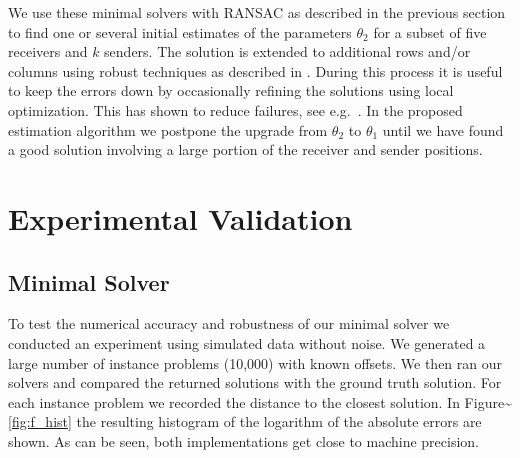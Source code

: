 \documentclass[
]{book}
\begin{document}
We use these minimal solvers with RANSAC as described in the previous section to find one or several initial estimates of the parameters \(\theta_2\) for a subset of five receivers and \(k\) senders. The solution is extended to additional rows and/or columns using robust techniques as described in \cite{batstone2016robust}. During this process it is useful to keep the errors down by occasionally refining the solutions using local optimization. This has shown to reduce failures, see e.g.~\cite{engels-stewenius-etal-06,klein2007parallel}.
In the proposed estimation algorithm we postpone the upgrade from \(\theta_2\) to \(\theta_1\) until we have found a good solution involving a large portion of the receiver and sender positions.
\vspace{-5pt}

\section{Experimental Validation}
\label{sec:exp}
\vspace{-5pt}
\subsection{Minimal Solver}
\vspace{-5pt}

To test the numerical accuracy and robustness of our minimal solver we conducted an experiment using simulated data without noise. We generated a large number of instance problems (10,000) with known offsets. We then ran our solvers and compared the returned solutions with the ground truth solution. For each instance problem we recorded the distance to the closest solution. In Figure\textasciitilde{}\ref{fig:f_hist} the resulting histogram of the logarithm of the absolute errors are shown. As can be seen, both implementations get close to machine precision.
\end{document}
